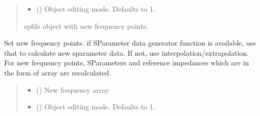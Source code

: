 \documentclass[letterpaper,10pt,english]{sphinxmanual}
\begin{document}
\begin{fulllineitems}
\begin{fulllineitems}
\begin{quote}
\begin{description}
\begin{itemize}
\item {} 
\sphinxAtStartPar
{} (\sphinxstyleliteralemphasis{\sphinxupquote{, }}) \textendash{} Object editing mode. Defaults to \sphinxhyphen{}1.

\end{itemize}

\sphinxAtStartPar
spfile object with new frequency points.

\sphinxAtStartPar
{\hyperref[\detokenize{touchstone:touchstone.spfile}]{}}

\end{description}\end{quote}

\end{fulllineitems}


\begin{fulllineitems}
\label{\detokenize{touchstone:touchstone.spfile.set_frequency_points}}
\pysigstartsignatures
{}
\pysigstopsignatures
\sphinxAtStartPar
Set new frequency points. if S\sphinxhyphen{}Parameter data generator function is
available, use that to calculate new s\sphinxhyphen{}parameter data. If not, use
interpolation/extrapolation. For new frequency points, S\sphinxhyphen{}Parameters
and reference impedances which are in the form of array are re\sphinxhyphen{}calculated.
\begin{quote}\begin{description}
\begin{itemize}
\item {} 
\sphinxAtStartPar
{} () \textendash{} New frequency array

\item {} 
\sphinxAtStartPar
{} (\sphinxstyleliteralemphasis{\sphinxupquote{, }}) \textendash{} Object editing mode. Defaults to \sphinxhyphen{}1.


\end{itemize}
\end{description}
\end{quote}
\end{fulllineitems}
\end{fulllineitems}
\end{document}
